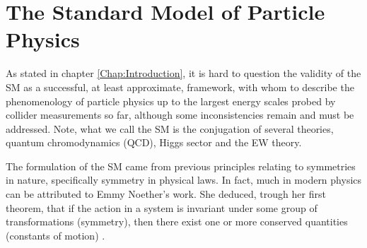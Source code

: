 
\renewcommand{\cleardoublepage}{}
\renewcommand{\clearpage}{}

\chapter{The Standard Model of Particle Physics}
\label{Chap:SM}

%
%


As stated in chapter \ref{Chap:Introduction}, it is hard to question the validity of the SM as a successful, at least approximate, framework, with whom to describe the phenomenology of particle physics up to the largest energy scales probed by collider measurements so far, although some inconsistencies remain and must be addressed.  
%
Note, what we call the SM is the conjugation of several theories, quantum chromodynamics (QCD), Higgs sector and the EW theory. 
%
%

The formulation of the SM came from previous principles relating to symmetries in nature, specifically symmetry in physical laws. 
%
In fact, much in modern physics can be attributed to Emmy Noether's work. She deduced, trough her first theorem, that if the action in a system is invariant under some group of transformations (symmetry), then there exist one or more conserved quantities (constants of motion) \cite{doi:10.1080/00411457108231446}. 

